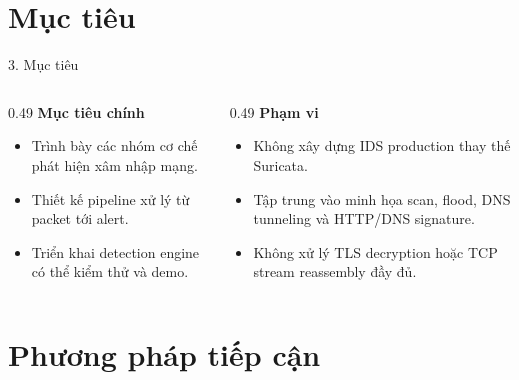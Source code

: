 \documentclass[t, aspectratio=169]{beamer}
\begin{document}
\section{Mục tiêu}

\begin{frame}{3. Mục tiêu}
    \begin{columns}[T,onlytextwidth]
        \begin{column}{0.49\textwidth}
            \textbf{Mục tiêu chính}
            \begin{itemize}
                \item Trình bày các nhóm cơ chế phát hiện xâm nhập mạng.
                \item Thiết kế pipeline xử lý từ packet tới alert.
                \item Triển khai detection engine có thể kiểm thử và demo.
            \end{itemize}
        \end{column}
        \begin{column}{0.49\textwidth}
            \textbf{Phạm vi}
            \begin{itemize}
                \item Không xây dựng IDS production thay thế Suricata.
                \item Tập trung vào minh họa scan, flood, DNS tunneling và HTTP/DNS signature.
                \item Không xử lý TLS decryption hoặc TCP stream reassembly đầy đủ.
            \end{itemize}
        \end{column}
    \end{columns}
\end{frame}

\section{Phương pháp tiếp cận}
\end{document}
